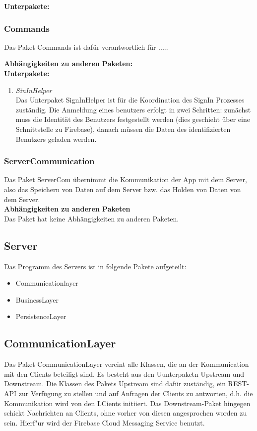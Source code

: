 \documentclass[parskip=full]{scrartcl}
\begin{document}
\textbf{Unterpakete:}\\

\subsubsection{Commands}
Das Paket Commands ist dafür verantwortlich für .....

\textbf{Abhängigkeiten zu anderen Paketen:}\\


\textbf{Unterpakete:}\\
\begin{enumerate}
	\item \textit{SinInHelper}\\
	Das Unterpaket SignInHelper ist für die Koordination des SignIn Prozesses zuständig. Die Anmeldung eines benutzers erfolgt in zwei Schritten: zunächst muss die Identität des Benutzers festgestellt werden (dies geschieht über eine Schnittstelle zu Firebase), danach müssen die Daten des identifizierten Benutzers geladen werden.
\end{enumerate}

\subsubsection{ServerCommunication}
Das Paket ServerCom übernimmt die Kommunikation der App mit dem Server, also das Speichern von Daten auf dem Server bzw. das Holden von Daten von dem Server.\\

\textbf{Abhängigkeiten zu anderen Paketen}\\
Das Paket hat keine Abhängigkeiten zu anderen Paketen.

\subsection{Server}
Das Programm des Servers ist in folgende Pakete aufgeteilt:
\begin{itemize}
	\item Communicationlayer
	\item BusinessLayer
	\item PersistenceLayer
\end{itemize}

\subsection{CommunicationLayer}
Das Paket CommunicationLayer vereint alle Klassen, die an der Kommunication mit den Clients beteiligt sind. Es besteht aus den Uunterpaketn Upstream und Downstream. Die Klassen des Pakets Upstream sind dafür zuständig, ein REST-API zur Verfügung zu stellen und auf Anfragen der Clients zu antworten, d.h. die Kommunikation wird von den LCients initiiert. Das Downstream-Paket hingegen schickt Nachrichten an Clients, ohne vorher von diesen angesprochen worden zu sein. Hierf"ur wird der Firebase Cloud Messaging Service benutzt.
\end{document}
